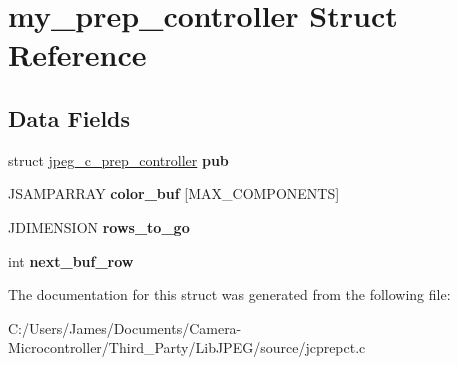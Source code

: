 \hypertarget{structmy__prep__controller}{}\section{my\+\_\+prep\+\_\+controller Struct Reference}
\label{structmy__prep__controller}
\subsection*{Data Fields}
\begin{DoxyCompactItemize}
\item 
\mbox{\label{structmy__prep__controller_adb21278f2295e9835d3fa55c0d4b718b}} 
struct \hyperlink{structjpeg__c__prep__controller}{jpeg\+\_\+c\+\_\+prep\+\_\+controller} {\bfseries pub}
\item 
\mbox{\label{structmy__prep__controller_a284ba5e2fbe7ec20d62f721872027b8c}} 
J\+S\+A\+M\+P\+A\+R\+R\+AY {\bfseries color\+\_\+buf} \mbox{[}M\+A\+X\+\_\+\+C\+O\+M\+P\+O\+N\+E\+N\+TS\mbox{]}
\item 
\mbox{\label{structmy__prep__controller_abaf5c475b6fbde86c13ba21a1b31592b}} 
J\+D\+I\+M\+E\+N\+S\+I\+ON {\bfseries rows\+\_\+to\+\_\+go}
\item 
\mbox{\label{structmy__prep__controller_a0c2df54c36ad172e81e5951d92aef8fc}} 
int {\bfseries next\+\_\+buf\+\_\+row}
\end{DoxyCompactItemize}


The documentation for this struct was generated from the following file\+:\begin{DoxyCompactItemize}
\item 
C\+:/\+Users/\+James/\+Documents/\+Camera-\/\+Microcontroller/\+Third\+\_\+\+Party/\+Lib\+J\+P\+E\+G/source/jcprepct.\+c\end{DoxyCompactItemize}
